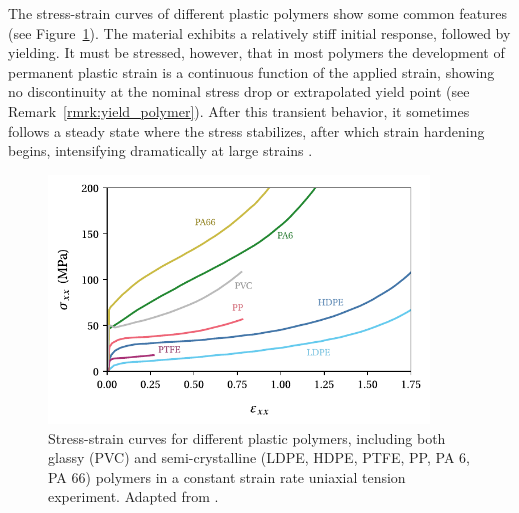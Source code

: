 The stress-strain curves of different plastic polymers show some common features (see Figure~\ref{fig:response_plastic_polymer}).
The material exhibits a relatively stiff initial response, followed by yielding.
It must be stressed, however, that in most polymers the development of permanent plastic strain is a continuous function of the applied strain, showing no discontinuity at the nominal stress drop or extrapolated yield point \citep{wardReviewYieldBehaviour1971} (see Remark~\ref{rmrk:yield_polymer}).
After this transient behavior, it sometimes follows a steady state where the stress stabilizes, after which strain hardening begins, intensifying dramatically at large strains \citep{hissNetworkStretchingSlip1999,callister2014materials,makradiTwophaseSelfconsistentModel2005}.
\begin{figure}[hbp]
	\centering
	\includegraphics[width=0.9\textwidth]{figures/response_plastic_polymer}
	\caption{Stress-strain curves for different plastic polymers, including both glassy (PVC) and semi-crystalline (LDPE, HDPE, PTFE, PP, PA 6, PA 66) polymers in a constant strain rate uniaxial tension experiment. Adapted from \cite{gsellYieldTransientEffects1981}.}
\label{fig:response_plastic_polymer}
\end{figure}

